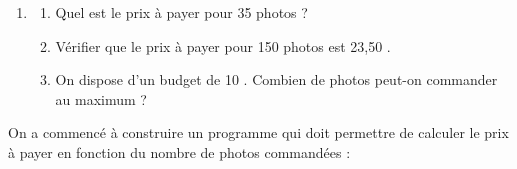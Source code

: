 \documentclass[11pt]{article}
\newcommand{\euro}{\eurologo{}}
\begin{document}
\begin{enumerate}
	\item \begin{enumerate}
		\item Quel est le prix à payer pour 35 photos ?
		\item Vérifier que le prix à payer pour 150 photos est 23,50 \euro{}.
		\item On dispose d’un budget de 10 \euro{}. Combien de photos peut-on commander au maximum ?
	\end{enumerate}
\end{enumerate}

On a commencé à construire un programme qui doit permettre de calculer le prix à payer en fonction du nombre de photos commandées :

\smallskip
\end{document}
